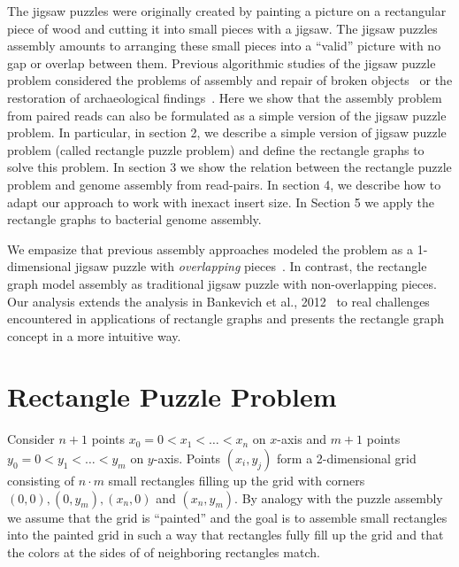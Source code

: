 \documentclass[a4paper]{article}
\begin{document}
The jigsaw puzzles were originally created by painting a picture on a rectangular piece of wood
and cutting it into
small pieces with a jigsaw. The jigsaw puzzles assembly amounts to  arranging these small pieces into a ``valid'' picture with no gap or overlap between
them. 
Previous  algorithmic studies of the jigsaw puzzle problem considered the problems of  assembly and repair of broken objects~\cite{Uccoluk99} 
or the restoration of archaeological findings~\cite{Kampel04}. Here we show
that the assembly problem from paired reads can also be formulated as a simple version of the jigsaw puzzle problem. 
In particular, in section 2, we describe a simple version of jigsaw puzzle problem (called rectangle puzzle problem) and define the rectangle graphs to solve this 
problem. In section 3 we show the relation between the rectangle puzzle problem and  genome assembly from read-pairs. In section 4, we describe how to adapt our approach 
to work with inexact insert size. In Section 5 we apply the rectangle graphs to bacterial genome assembly.  

We empasize that previous assembly approaches modeled the  problem as a 1-dimensional  
jigsaw puzzle with {\em overlapping} pieces~\cite{Jones04}.  
In contrast, the rectangle graph model assembly as traditional jigsaw puzzle with non-overlapping pieces. Our analysis extends the analysis in Bankevich et al., 2012~\cite{Bankevich12} to real challenges encountered in applications of rectangle graphs and presents the rectangle graph concept in a more intuitive way.

\section{Rectangle Puzzle Problem} 

Consider $n+1$ points $x_0=0 < x_1 <  \ldots < x_n$ on $x$-axis and $m+1$ points $y_0=0 < y_1 <  \ldots < y_m$ on $y$-axis. Points $(x_i,y_j)$ form a 2-dimensional grid consisting of $n \cdot m$ small rectangles filling up the grid with corners $(0,0), (0,y_m), (x_n,0)$ and $(x_n,y_m)$. By analogy with the puzzle assembly we assume that the grid is ``painted'' and the goal is to assemble small rectangles into the painted grid in such a way that rectangles fully fill up the grid and that the colors at the sides of of neighboring  rectangles match. 
\end{document}

